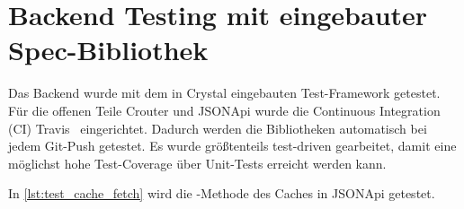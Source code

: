 \section{Backend Testing mit eingebauter Spec-Bibliothek}
\label{sec:t_backend_testing_mit_eingebauter_spec_bibliothek'}

Das Backend wurde mit dem in Crystal eingebauten Test-Framework getestet.  Für
die offenen Teile Crouter und JSONApi wurde die
Continuous Integration (CI) Travis~\cite{travis} eingerichtet.  Dadurch
werden die Bibliotheken automatisch bei jedem Git-Push getestet. Es wurde
größtenteils test-driven gearbeitet, damit eine möglichst hohe
Test-Coverage über Unit-Tests erreicht werden kann.

In \cref{lst:test_cache_fetch} wird die -Methode des Caches in
JSONApi getestet.


